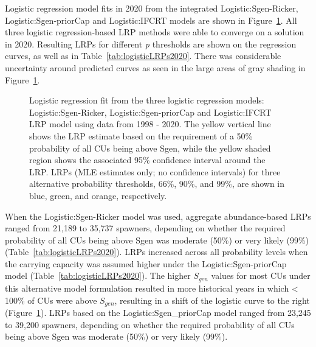 \documentclass[11pt]{book}
\begin{document}
Logistic regression model fits in 2020 from the integrated Logistic:Sgen-Ricker, Logistic:Sgen-priorCap and Logistic:IFCRT models are shown in Figure~\ref{fig:coho-IM-logisticFit2020}. All three logistic regression-based LRP methods were able to converge on a solution in 2020. Resulting LRPs for different \emph{p} thresholds are shown on the regression curves, as well as in Table~\ref{tab:logisticLRPs2020}. There was considerable uncertainty around predicted curves as seen in the large areas of gray shading in Figure~\ref{fig:coho-IM-logisticFit2020}.
\begin{figure}[htb]

{\centering {} 

}

\caption{Logistic regression fit from the three logistic regression models: Logistic:Sgen-Ricker, Logistic:Sgen-priorCap and Logistic:IFCRT LRP model using data from 1998 - 2020. The yellow vertical line shows the LRP estimate based on the requirement of a 50\% probability of all CUs being above Sgen, while the yellow shaded region shows the associated 95\% confidence interval around the LRP. LRPs (MLE estimates only; no confidence intervals) for three alternative probability thresholds, 66\%, 90\%, and 99\%, are shown in blue, green, and orange, respectively.}\label{fig:coho-IM-logisticFit2020}
\end{figure}
When the Logistic:Sgen-Ricker model was used, aggregate abundance-based LRPs ranged from 21,189 to 35,737 spawners, depending on whether the required probability of all CUs being above Sgen was moderate (50\%) or very likely (99\%) (Table~\ref{tab:logisticLRPs2020}). LRPs increased across all probability levels when the carrying capacity was assumed higher under the Logistic:Sgen-priorCap model (Table~\ref{tab:logisticLRPs2020}). The higher \(S_{gen}\) values for most CUs under this alternative model formulation resulted in more historical years in which \textless{} 100\% of CUs were above \(S_{gen}\), resulting in a shift of the logistic curve to the right (Figure~\ref{fig:coho-IM-logisticFit2020}). LRPs based on the Logistic:Sgen\_priorCap model ranged from 23,245 to 39,200 spawners, depending on whether the required probability of all CUs being above Sgen was moderate (50\%) or very likely (99\%).
\end{document}
